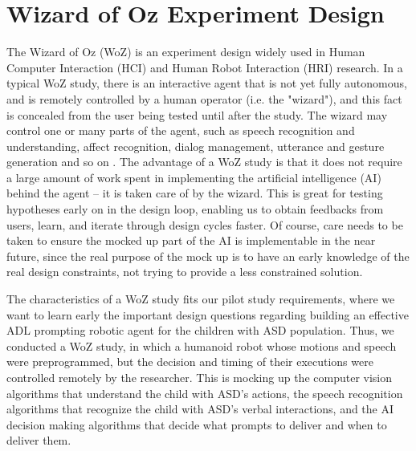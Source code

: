 \documentclass{ut-thesis}
\begin{document}

\section{Wizard of Oz Experiment Design}

The Wizard of Oz (WoZ) is an experiment design widely used in Human Computer Interaction (HCI) and Human Robot Interaction (HRI) research.  In a typical WoZ study, there is an interactive agent that is not yet fully autonomous, and is remotely controlled by a human operator (i.e. the "wizard"), and this fact is concealed from the user being tested until after the study.  The wizard may control one or many parts of the agent, such as speech recognition and understanding, affect recognition, dialog management, utterance and gesture generation and so on \cite{bhargava2013demonstration}.  The advantage of a WoZ study is that it does not require a large amount of work spent in implementing the artificial intelligence (AI) behind the agent -- it is taken care of by the wizard.  This is great for testing hypotheses early on in the design loop, enabling us to obtain feedbacks from users, learn, and iterate through design cycles faster.  Of course, care needs to be taken to ensure the mocked up part of the AI is implementable in the near future, since the real purpose of the mock up is to have an early knowledge of the real design constraints, not trying to provide a less constrained solution.

The characteristics of a WoZ study fits our pilot study requirements, where we want to learn early the important design questions regarding building an effective ADL prompting robotic agent for the children with ASD population.  Thus, we conducted a WoZ study, in which a humanoid robot whose motions and speech were preprogrammed, but the decision and timing of their executions were controlled remotely by the researcher.  This is mocking up the computer vision algorithms that understand the child with ASD's actions, the speech recognition algorithms that recognize the child with ASD's verbal interactions, and the AI decision making algorithms that decide what prompts to deliver and when to deliver them.
\end{document}
